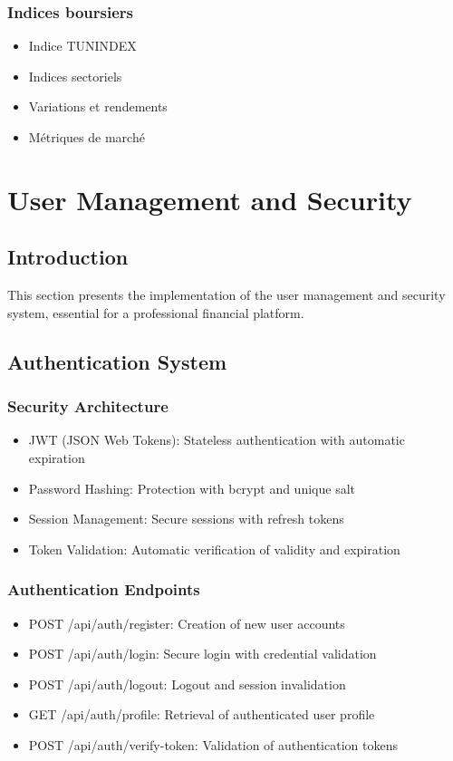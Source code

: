 \documentclass[12pt,a4paper]{article}
\begin{document}
\subsubsection{Indices boursiers}
\begin{itemize}
    \item Indice TUNINDEX
    \item Indices sectoriels
    \item Variations et rendements
    \item Métriques de marché
\end{itemize}

\section{User Management and Security}

\subsection{Introduction}
This section presents the implementation of the user management and security system, essential for a professional financial platform.

\subsection{Authentication System}
\subsubsection{Security Architecture}
\begin{itemize}
    \item JWT (JSON Web Tokens): Stateless authentication with automatic expiration
    \item Password Hashing: Protection with bcrypt and unique salt
    \item Session Management: Secure sessions with refresh tokens
    \item Token Validation: Automatic verification of validity and expiration
\end{itemize}

\subsubsection{Authentication Endpoints}
\begin{itemize}
    \item POST /api/auth/register: Creation of new user accounts
    \item POST /api/auth/login: Secure login with credential validation
    \item POST /api/auth/logout: Logout and session invalidation
    \item GET /api/auth/profile: Retrieval of authenticated user profile
    \item POST /api/auth/verify-token: Validation of authentication tokens
\end{itemize}
\end{document}
